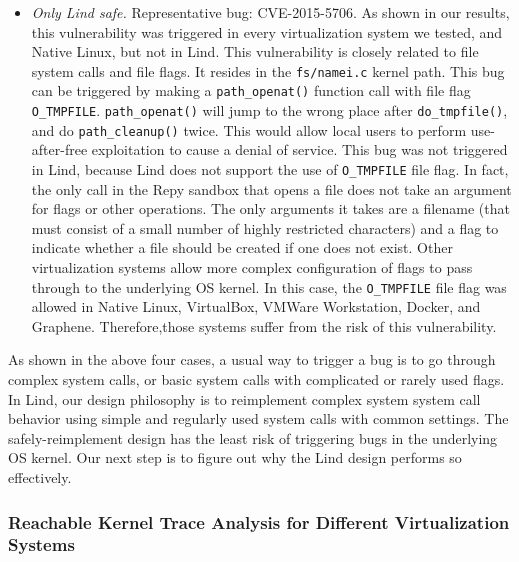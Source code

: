 {\begin{itemize}
\item \emph{Only Lind safe.}  Representative bug: CVE-2015-5706. As
shown in our results, this vulnerability was triggered in every
virtualization system we tested, and Native Linux, but not in Lind. This vulnerability
is closely related to file system calls and file flags. It resides in the \texttt{fs/namei.c}
kernel path. This bug can be triggered by making a \texttt{path\_openat()} function
call with file flag \texttt{O\_TMPFILE}. \texttt{path\_openat()} will jump to the wrong
place after \texttt{do\_tmpfile()}, and do \texttt{path\_cleanup()} twice. This would
allow local users to perform use-after-free exploitation to cause a denial of service.
This bug was not triggered in Lind, because Lind does not support the use of
\texttt{O\_TMPFILE} file flag. In fact, the only call in the Repy sandbox that
opens a file does not take an argument for flags or other operations.  The
only arguments it takes are a filename (that must consist of a small number
of highly restricted characters) and a flag to indicate whether a file should
be created if one does not exist.
Other virtualization systems allow more complex configuration of flags to
pass through to the underlying OS kernel.   
In this case, the \texttt{O\_TMPFILE} file flag was
allowed in Native Linux, VirtualBox, VMWare Workstation, Docker, and Graphene.
Therefore,those systems suffer from the risk of this vulnerability.

\end{itemize}

As shown in the above four cases, a usual way to trigger a bug is to go through
complex system calls,
or basic system calls with complicated or rarely used flags. In Lind, our
design philosophy is to reimplement complex system system call behavior
using simple and regularly used system calls with common settings.
The safely-reimplement design
has the least risk of triggering bugs in the underlying OS kernel. Our next step
is to figure out why the Lind design performs so effectively.

\subsubsection{Reachable Kernel Trace Analysis for Different Virtualization
Systems}
\label{Reachable-Kernel-Trace-Analysis-for-Different-Virtualization-Systems}

}
